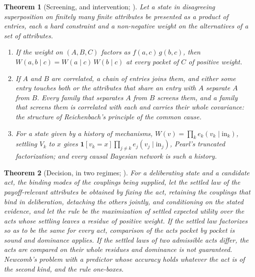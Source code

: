 \documentclass[11pt]{article}
\newtheorem{theorem}{Theorem}
\theoremstyle{definition}
\begin{document}
\begin{theorem}[Screening, and intervention; \cite{AethusCausality}]\label{thm:core_causal}
Let a state in disagreeing superposition on finitely many finite attributes be presented as a product of entries, each a hard constraint and a non-negative weight on the alternatives of a set of attributes.
\begin{enumerate}
\item[(i)] If the weight on $(A, B, C)$ factors as $f(a, c)\, g(b, c)$, then $W(a, b \mid c) = W(a \mid c)\, W(b \mid c)$ at every pocket of $C$ of positive weight.
\item[(ii)] If $A$ and $B$ are correlated, a chain of entries joins them, and either some entry touches both or the attributes that share an entry with $A$ separate $A$ from $B$. Every family that separates $A$ from $B$ screens them, and a family that screens them is correlated with each and carries their whole covariance: the structure of Reichenbach's principle of the common cause.
\item[(iii)] For a state given by a history of mechanisms, $W(v) = \prod_k e_k(v_k \mid \mathrm{in}_k)$, settling $V_k$ to $x$ gives $\mathbf{1}[v_k = x] \prod_{j \neq k} e_j(v_j \mid \mathrm{in}_j)$, Pearl's truncated factorization; and every causal Bayesian network is such a history.
\end{enumerate}
\end{theorem}

\begin{theorem}[Decision, in two regimes; \cite{AethusDecision}]\label{thm:core_decision}
For a deliberating state and a candidate act, the binding modes of the couplings being supplied, let the settled law of the payoff-relevant attributes be obtained by fixing the act, retaining the couplings that bind in deliberation, detaching the others jointly, and conditioning on the stated evidence, and let the rule be the maximization of settled expected utility over the acts whose settling leaves a residue of positive weight. If the settled law factorizes so as to be the same for every act, comparison of the acts pocket by pocket is sound and dominance applies. If the settled laws of two admissible acts differ, the acts are compared on their whole residues and dominance is not guaranteed. Newcomb's problem with a predictor whose accuracy holds whatever the act is of the second kind, and the rule one-boxes.
\end{theorem}
\end{document}
